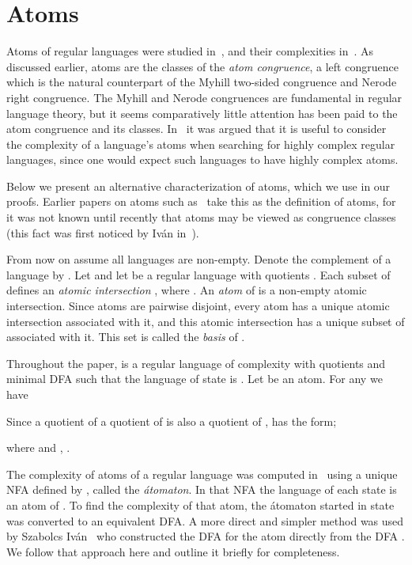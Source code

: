 \documentclass{llncs}
\begin{document}
\section{Atoms}
Atoms of regular languages were studied in~\cite{BrTa14}, and their complexities  in~\cite{BrDa14a,BrTa13}.
As discussed earlier, atoms are the classes of the \emph{atom congruence}, a left congruence which is the natural counterpart of the Myhill two-sided congruence and Nerode right congruence. 
The Myhill and Nerode congruences are fundamental in regular language theory, but it seems comparatively little attention has been paid to the atom congruence and its classes.
In~\cite{Brz13} it was argued that it is useful to consider the complexity of a language's atoms when searching for highly complex regular languages, since one would expect such languages to have highly complex atoms.

Below we present an alternative characterization of atoms, which we use in our proofs. Earlier papers on atoms such as~\cite{BrDa14a,BrTa13,BrTa14} take this as the definition of atoms, for it was not known until recently that atoms may be viewed as congruence classes (this fact was first noticed by Iv\'an in~\cite{Iva14}).

From now on assume all languages are non-empty.
Denote the complement of a language  by .
Let  and let  be a regular language with quotients . Each subset  of  defines an \emph{atomic intersection} , where .
An \emph{atom} of  is a non-empty atomic intersection. 
Since atoms are pairwise disjoint,  every atom  has a unique atomic intersection associated with it, and this atomic intersection has a unique subset  of  associated with it. This set  is called the \emph{basis} of .

Throughout the paper,  is a regular language of complexity  with quotients  and minimal DFA  such that the language of state  is . 
Let  be an atom. For any  we have 

Since a quotient of a quotient of  is also a quotient of ,  has the form;

where  and , .

The complexity of atoms of a regular language was computed in~\cite{BrTa13} using a unique NFA defined by , called the \emph{\'atomaton}. In that NFA the language of each state  is an atom  of . To find the complexity of that atom, the \'atomaton started in state  was converted to an equivalent DFA. 
A more direct and simpler method was used by Szabolcs Iv\'an~\cite{Iva14} who constructed the DFA for the atom directly from the DFA . We follow that approach here and outline it briefly for completeness. 
\end{document}
